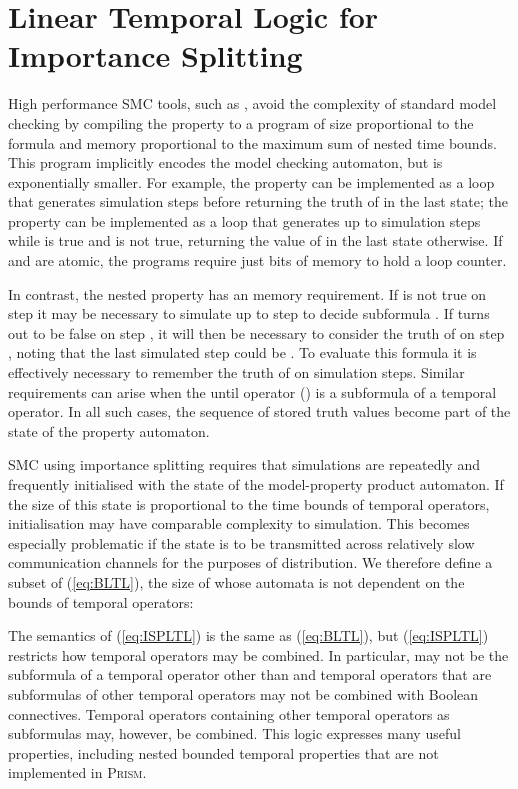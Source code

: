 \documentclass{llncs}
\begin{document}
\section{Linear Temporal Logic for Importance Splitting\label{sec:ISPLTL}}

High performance SMC tools, such as \cite{SedwardsJegourelLegay2012,BoyerCorreLegaySedwards2013},
avoid the complexity of standard model checking by compiling the property
to a program of size proportional to the formula and memory proportional
to the maximum sum of nested time bounds. This program implicitly
encodes the model checking automaton, but is exponentially smaller.
For example, the property  can be implemented
as a loop that generates  simulation steps before returning the
truth of  in the last state; the property 
can be implemented as a loop that generates up to  simulation
steps while  is true and  is not true, returning the
value of  in the last state otherwise. If  and 
are atomic, the programs require just  bits
of memory to hold a loop counter.

In contrast, the nested property 
has an  memory requirement. If  is not true
on step  it may be necessary to simulate up to step 
to decide subformula . If 
turns out to be false on step , it will then be necessary to consider
the truth of  on step , noting that the last simulated
step could be . To evaluate this formula it is effectively
necessary to remember the truth of  on  simulation
steps. Similar requirements can arise when the until operator ()
is a subformula of a temporal operator. In all such cases, the sequence
of stored truth values become part of the state of the property automaton.

SMC using importance splitting requires that simulations are repeatedly
and frequently initialised with the state of the model-property product
automaton. If the size of this state is proportional to the time bounds
of temporal operators, initialisation may have comparable complexity
to simulation. This becomes especially problematic if the state is
to be transmitted across relatively slow communication channels for
the purposes of distribution. We therefore define a subset of (\ref{eq:BLTL}),
the size of whose automata is not dependent on the bounds of temporal
operators:



The semantics of (\ref{eq:ISPLTL}) is the same as (\ref{eq:BLTL}),
but (\ref{eq:ISPLTL}) restricts how temporal operators may be combined.
In particular,  may not be the subformula of a temporal
operator other than  and temporal operators that are
subformulas of other temporal operators may not be combined with Boolean
connectives. Temporal operators containing other temporal operators
as subformulas may, however, be combined. This logic expresses many
useful properties, including nested bounded temporal properties that
are not implemented in \textsc{Prism}.
\end{document}
